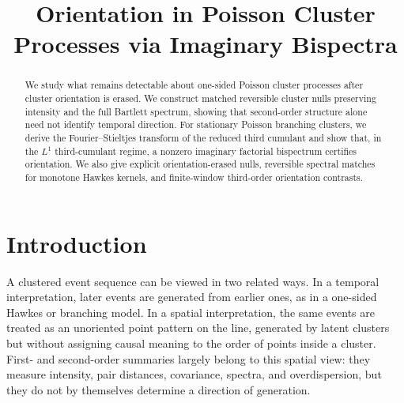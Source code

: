 \documentclass[aap,press]{apt} \volno{00} \partno{00}
\newcommand{\1}{\mathbf{1}}
\numberwithin{equation}{section}
\begin{document}

\title{Orientation in Poisson Cluster Processes via Imaginary Bispectra}




\begin{abstract}
We study what remains detectable about one-sided Poisson cluster processes after cluster orientation is erased. We construct matched reversible cluster nulls preserving intensity and the full Bartlett spectrum, showing that second-order structure alone need not identify temporal direction. For stationary Poisson branching clusters, we derive the Fourier--Stieltjes transform of the reduced third cumulant and show that, in the $L^1$ third-cumulant regime, a nonzero imaginary factorial bispectrum certifies orientation. We also give explicit orientation-erased nulls, reversible spectral matches for monotone Hawkes kernels, and finite-window third-order orientation contrasts.
\end{abstract}



\section{Introduction}

A clustered event sequence can be viewed in two related ways. In a temporal interpretation, later events are generated from earlier ones, as in a one-sided Hawkes or branching model. In a spatial interpretation, the same events are treated as an unoriented point pattern on the line, generated by latent clusters but without assigning causal meaning to the order of points inside a cluster. First- and second-order summaries largely belong to this spatial view: they measure intensity, pair distances, covariance, spectra, and overdispersion, but they do not by themselves determine a direction of generation.
\end{document}
